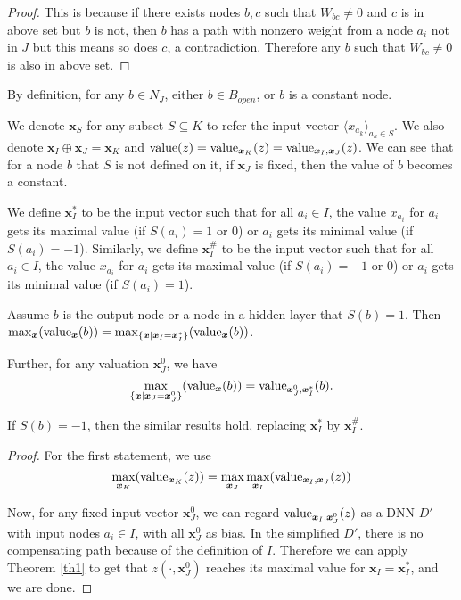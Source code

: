 				\begin{proof}
					This is because if there exists nodes $b,c$ such that $W_{bc}\neq 0$ and $c$ is in above set but $b$ is not, then $b$ has a path with nonzero weight from a node $a_i$ not in $J$ but this means so does $c$, a contradiction. Therefore any $b$ such that $W_{bc}\neq 0$ is also in above set.
				\end{proof}
				
				By definition, for any $b\in N_J$, either $b\in B_{open}$, or $b$ is a constant node.
				
				We denote $\boldsymbol{x}_S$ for any subset $S\subseteq K$ to refer the input vector $\langle x_{a_k}\rangle_{a_k\in S}$. We also denote $\boldsymbol{x}_I\oplus \boldsymbol{x}_J = \boldsymbol{x}_K$ and ${\textrm{value}}(z)={\textrm{value}}_{\boldsymbol{x}_K}(z)={\textrm{value}}_{\boldsymbol{x}_I,\boldsymbol{x}_J} (z)$. We can see that for a node $b$ that $S$ is not defined on it, if $\boldsymbol{x}_J$ is fixed, then the value of $b$ becomes a constant.
				
				We define $\boldsymbol{x}_I^*$ to be the input vector such that for all $a_i \in I$, the value $x_{a_i}$ for $a_i$ gets its maximal value (if $S(a_i)=1$ or $0$) or $a_i$ gets its minimal value (if $S(a_i)=-1$). Similarly, we define $\boldsymbol{x}_I^\#$ to be the input vector such that for all $a_i \in I$, the value $x_{a_i}$ for $a_i$ gets its maximal value (if $S(a_i)=-1$ or $0$) or $a_i$ gets its minimal value (if $S(a_i)=1$).
				
				
				
				\begin{lemma} \label{lem:reach_max_2}
					
					Assume $b$ is the output node or a node in a hidden layer that $S(b)=1$. Then
					$\max_{\boldsymbol{x}} ({\textrm{value}}_{\boldsymbol{x}}(b)) =\max_{\{\boldsymbol{x} \mid \boldsymbol{x}_I=\boldsymbol{x}^*_I\}} ({\textrm{value}}_{\boldsymbol{x}}(b))$.
					
					Further,  for any valuation $\boldsymbol{x}^0_J$, 
					we have $$\max_{\{\boldsymbol{x} \mid \boldsymbol{x}_J=\boldsymbol{x}^0_J\}} ({\textrm{value}}_{\boldsymbol{x}}(b)) =  {\textrm{value}}_{\boldsymbol{x}^0_J,\boldsymbol{x}_I^*}(b).$$
					
					If $S(b)=-1$, then the similar results hold, replacing $\boldsymbol{x}^*_I$ by $\boldsymbol{x}^\#_I$. 
				\end{lemma}
				
				\begin{proof}
					For the first statement, we use 
					$$\max_{\boldsymbol{x}_K} ({\textrm{value}}_{\boldsymbol{x}_K}(z)) =\max_{\boldsymbol{x}_J} \max_{\boldsymbol{x}_I} ({\textrm{value}}_{\boldsymbol{x}_I,\boldsymbol{x}_J}(z))$$
					
					Now, for any fixed input vector $\boldsymbol{x}^0_J$, we can regard ${\textrm{value}}_{\boldsymbol{x}_I,\boldsymbol{x}^0_J}(z)$ as a DNN $D'$ with input nodes $a_i\in I$, with all $\boldsymbol{x}^0_J$ %
					as bias. In the simplified $D'$, there is no compensating path because of the definition of $I$. Therefore we can apply Theorem \ref{th1} to get that $z(\cdot,\boldsymbol{x}^0_J)$ reaches its maximal value for $\boldsymbol{x}_I=\boldsymbol{x}_I^*$, and we are done.
				\end{proof}
				
